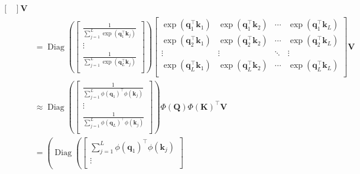 \documentclass[11pt]{article}
\DeclareMathOperator{\diag}{Diag}
\begin{document}
\begin{align*}
\begin{bmatrix}
            \end{bmatrix} \bm{V} \\
         &= \diag \left( \begin{bmatrix}
                           \frac{1}{\sum_{j = 1}^{L} \exp \left( \bm{q}_{1}^{\top} \bm{k}_{j} \right)} \\
                           \vdots \\
                           \frac{1}{\sum_{j = 1}^{L} \exp \left( \bm{q}_{L}^{\top} \bm{k}_{j} \right)} \\
                         \end{bmatrix} \right) \begin{bmatrix}
              \exp \left( \bm{q}_{1}^{\top} \bm{k}_{1} \right) &\exp \left( \bm{q}_{1}^{\top} \bm{k}_{2} \right) &\cdots &\exp \left( \bm{q}_{1}^{\top} \bm{k}_{L} \right) \\
              \exp \left( \bm{q}_{2}^{\top} \bm{k}_{1} \right) &\exp \left( \bm{q}_{2}^{\top} \bm{k}_{2} \right) &\cdots &\exp \left( \bm{q}_{2}^{\top} \bm{k}_{L} \right) \\
              \vdots &\vdots &\ddots &\vdots \\
                                                 \exp \left( \bm{q}_{L}^{\top} \bm{k}_{1} \right) &\exp \left( \bm{q}_{L}^{\top} \bm{k}_{2} \right) &\cdots &\exp \left( \bm{q}_{L}^{\top} \bm{k}_{L} \right) \\
                                               \end{bmatrix} \bm{V} \\
         &\approx \diag \left( \begin{bmatrix}
                           \frac{1}{\sum_{j = 1}^{L} \phi \left( \bm{q}_{1} \right)^{\top} \phi \left( \bm{k}_{j} \right)} \\
                           \vdots \\
                           \frac{1}{\sum_{j = 1}^{L} \phi \left( \bm{q}_{L} \right)^{\top} \phi \left( \bm{k}_{j} \right)} \\
                         \end{bmatrix} \right) \Phi \left( \bm{Q} \right) \Phi \left( \bm{K} \right)^{\top} \bm{V} \\
         &= \left( \diag \left( \begin{bmatrix}
                           \sum_{j = 1}^{L} \phi \left( \bm{q}_{1} \right)^{\top} \phi \left( \bm{k}_{j} \right) \\
                           \vdots \\

\end{bmatrix}
\end{align*}
\end{document}
